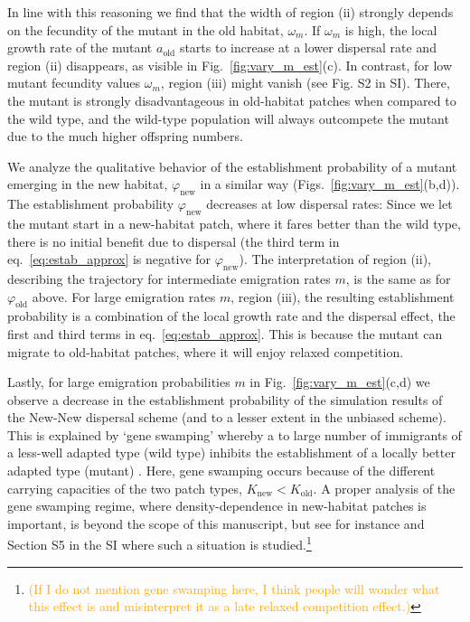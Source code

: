 \documentclass[a4paper,11pt]{article}
\newcommand{\pete}[1]{\textcolor{orange}{(#1)}}
\newcommand{\chg}[1]{\textcolor{change}{#1}}
\begin{document}

 
\chg{In line with this reasoning we find} that the width of region (ii) strongly depends on the fecundity of the mutant in the old habitat, $\omega_m$. If $\omega_m$ is high, the local growth rate of the mutant $a_{\text{old}}$ starts to increase at a lower dispersal rate 
\chg{and }region (ii) disappears, as visible in Fig.~\ref{fig:vary_m_est}(c). In contrast, for low mutant fecundity values $\omega_m$, region (iii) might vanish (see Fig. S2 in SI). There, the mutant is strongly disadvantageous in old-habitat patches when compared to the wild type, and the wild-type population will always outcompete the mutant due to the much higher offspring numbers.

We analyze the qualitative behavior of the establishment probability of a mutant emerging in the new habitat, $\varphi_{\text{new}}$ in a similar way (Figs.~\ref{fig:vary_m_est}(b,d)). The establishment probability $\varphi_{\text{new}}$ decreases at low dispersal rates: Since we let the mutant start in a new-habitat patch, where it fares better than the wild type, there is no initial benefit due to dispersal (the third term in eq.~\eqref{eq:estab_approx} is negative for $\varphi_{\text{new}}$). The interpretation of region (ii), describing the trajectory for intermediate emigration rates $m$, is the same as for $\varphi_{\text{old}}$ above. For large emigration rates $m$, region (iii), the resulting establishment probability is a combination of the local growth rate and the dispersal effect, the first and third terms in eq.~\eqref{eq:estab_approx}. This is because the mutant can migrate to old-habitat patches, where it will enjoy relaxed competition. %

\chg{Lastly, for large emigration probabilities $m$ in Fig.~\ref{fig:vary_m_est}(c,d) we observe a decrease in the establishment probability of the simulation results of the New-New dispersal scheme (and to a lesser extent in the unbiased scheme). This is explained by `gene swamping' whereby a to large number of immigrants of a less-well adapted type (wild type) inhibits the establishment of a locally better adapted type (mutant) \citep{nagylaki_1978,lenormand_2002}. Here, gene swamping occurs because of the different carrying capacities of the two patch types, $K_{\text{new}}<K_{\text{old}}$. A proper analysis of the gene swamping regime, where density-dependence in new-habitat patches is important, is beyond the scope of this manuscript, but see for instance \citet{tomasini_2018} and Section S5 in the SI where such a situation is studied.}\footnote{\pete{If I do not mention gene swamping here, I think people will wonder what this effect is and misinterpret it as a late relaxed competition effect.}}
\end{document}
